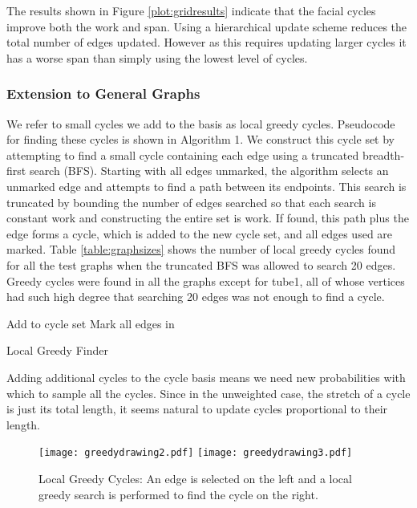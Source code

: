\documentclass{sig-alternate}
\begin{document}
The results shown in Figure \ref{plot:gridresults}
indicate that the facial cycles
improve both the work and span. Using a hierarchical update scheme reduces
the total number of edges updated. However as this requires updating larger
cycles it has a worse span than simply using the lowest level of cycles.



\subsubsection{Extension to General Graphs}

We refer to small cycles we add
to the basis as local greedy cycles. Pseudocode for finding
these cycles is shown in Algorithm 1.
We construct this cycle set by attempting to find a small cycle containing
each edge
using a truncated breadth-first search (BFS).
Starting with all edges unmarked, the algorithm selects an unmarked edge and attempts
to find a path between its endpoints. This search is truncated by bounding the
number of edges searched so that each search
is constant work and constructing the entire set is  work.
If found, this path plus the edge forms a cycle, which
is added to the new cycle set, and all edges used are marked.
Table \ref{table:graphsizes} shows the number of local greedy cycles
found for all the test graphs when the truncated BFS was
allowed to search 20 edges.
Greedy cycles were found in all the graphs except for tube1,
all of whose vertices had such high degree that
searching 20 edges was not enough to find a cycle.

\begin{algorithm}[]
\begin{algorithmic}[]
\For {}
\State 
\State Add  to cycle set
\State Mark all edges in 
\EndIf
\EndFor
\EndFunction
\end{algorithmic}
\label{alg:LocalGreedy}
\caption{Local Greedy Finder}
\end{algorithm}


Adding additional cycles to the cycle basis means we need
new probabilities with which to sample all the cycles. Since in the unweighted
case, the stretch of a cycle is just its total length,
it seems natural to update cycles proportional
to their length.

\begin{figure}[h]
\centering
{}
\texttt{[image: greedydrawing2.pdf]}
\endminipage
{}
\texttt{[image: greedydrawing3.pdf]}
\endminipage
\caption{Local Greedy Cycles: An edge is selected on the left and a local
greedy search is performed to find the cycle on the right.}
\label{fig:localgreedy}
\end{figure}
\end{document}
